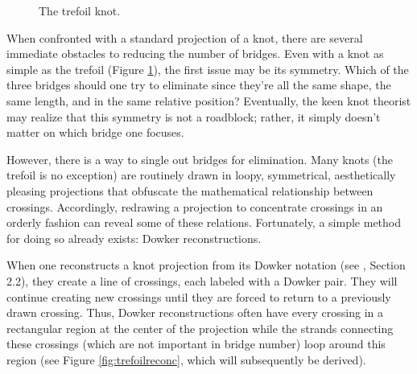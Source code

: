 \documentclass[titlepage]{article}
\begin{document}
\begin{figure}[h!]
    \centering
    \vspace{-2.3em}
    \caption{The trefoil knot.}
    \label{fig:trefoil}
\end{figure}

\noindent When confronted with a standard projection of a knot, there are several immediate obstacles to reducing the number of bridges. Even with a knot as simple as the trefoil (Figure \ref{fig:trefoil}), the first issue may be its symmetry. Which of the three bridges should one try to eliminate since they're all the same shape, the same length, and in the same relative position? Eventually, the keen knot theorist may realize that this symmetry is not a roadblock; rather, it simply doesn't matter on which bridge one focuses.\par
However, there is a way to single out bridges for elimination. Many knots (the trefoil is no exception) are routinely drawn in loopy, symmetrical, aesthetically pleasing projections that obfuscate the mathematical relationship between crossings. Accordingly, redrawing a projection to concentrate crossings in an orderly fashion can reveal some of these relations. Fortunately, a simple method for doing so already exists: Dowker reconstructions.\par
When one reconstructs a knot projection from its Dowker notation (see \cite{bib:knotnotes}, Section 2.2), they create a line of crossings, each labeled with a Dowker pair. They will continue creating new crossings until they are forced to return to a previously drawn crossing. Thus, Dowker reconstructions often have every crossing in a rectangular region at the center of the projection while the strands connecting these crossings (which are not important in bridge number) loop around this region (see Figure \ref{fig:trefoilreconc}, which will subsequently be derived).\par
\end{document}
